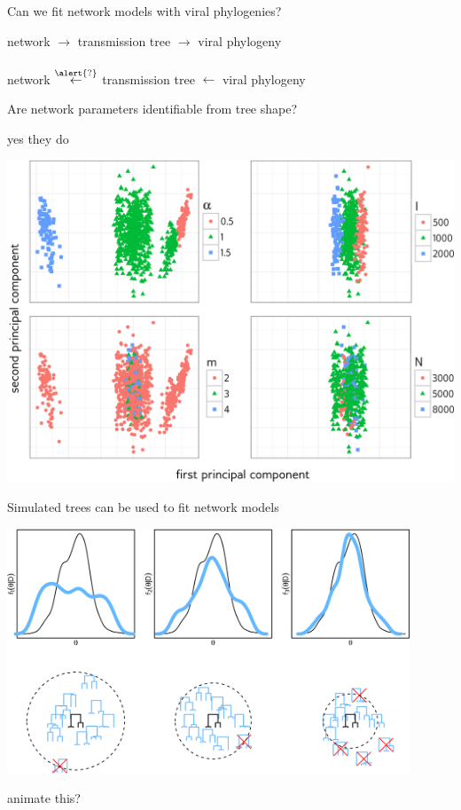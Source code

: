 \documentclass{beamer}
\begin{document}
\begin{frame}{Can we fit network models with viral phylogenies?}
  \begin{center}
  network $\to$ transmission tree $\to$ viral phylogeny \\
  \hfill\\
  network $\stackrel{\alert{?}}{\leftarrow}$ transmission tree $\leftarrow$ viral phylogeny \\
  \end{center}
\end{frame}

\begin{frame}{Are network parameters identifiable from tree shape?}
  \begin{minipage}[p][\textheight][t]{\textwidth}
  \end{minipage}
\end{frame}

\begin{frame}{yes they do}
  \centerline{\includegraphics[height=0.8\textheight]{kernel-kpca}}
\end{frame}

\begin{frame}{Simulated trees can be used to fit network models}
  \centerline{\includegraphics[width=0.9\textwidth]{abc-smc}}

  \centerline{animate this?}
\end{frame}
\end{document}
